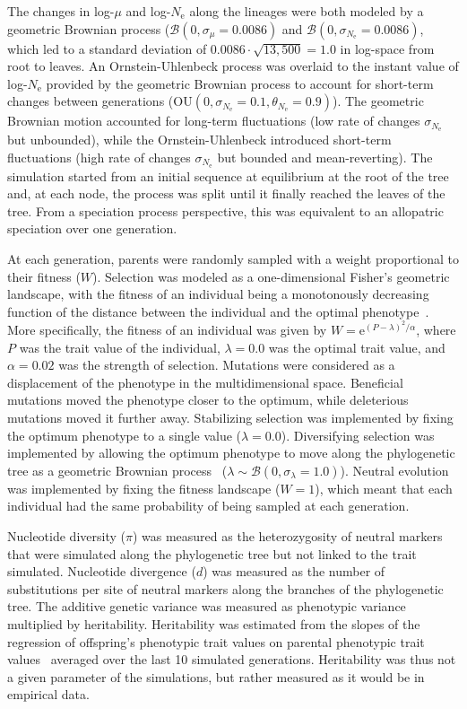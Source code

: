 \documentclass{article}
\newcommand{\Multiply}{\cdot}
\newcommand{\e}{\text{e}}
\newcommand{\Ne}{N_{\text{e}}}
\newcommand{\Trait}{P}
\newcommand{\MutationRatePheno}{\mu}
\newcommand{\brownian}{\mathcal{B}}
\begin{document}
The changes in log-$\MutationRatePheno$ and log-$\Ne$ along the lineages were both modeled by a geometric Brownian process ($\brownian \left(0, \sigma_{\MutationRatePheno}=0.0086\right)$ and $\brownian \left(0, \sigma_{\Ne}=0.0086\right)$, which led to a standard deviation of $0.0086 \Multiply \sqrt {13,500} = 1.0$ in log-space from root to leaves.
An Ornstein-Uhlenbeck process was overlaid to the instant value of log-$\Ne$ provided by the geometric Brownian process to account for short-term changes between generations ($\text{OU} \left(0, \sigma_{\Ne}=0.1, \theta_{\Ne}=0.9\right)$).
The geometric Brownian motion accounted for long-term fluctuations (low rate of changes $\sigma_{\Ne}$ but unbounded), while the Ornstein-Uhlenbeck introduced short-term fluctuations (high rate of changes $\sigma_{\Ne}$ but bounded and mean-reverting).
The simulation started from an initial sequence at equilibrium at the root of the tree and, at each node, the process was split until it finally reached the leaves of the tree.
From a speciation process perspective, this was equivalent to an allopatric speciation over one generation.

At each generation, parents were randomly sampled with a weight proportional to their fitness ($W$).
Selection was modeled as a one-dimensional Fisher's geometric landscape, with the fitness of an individual being a monotonously decreasing function of the distance between the individual and the optimal phenotype~\parencite{tenaillon_utility_2014,blanquart_epistasis_2016}.
More specifically, the fitness of an individual was given by $W = \e^{(\Trait - \lambda)^2/ \alpha}$, where $\Trait$ was the trait value of the individual, $\lambda=0.0$ was the optimal trait value, and $\alpha=0.02$ was the strength of selection.
Mutations were considered as a displacement of the phenotype in the multidimensional space.
Beneficial mutations moved the phenotype closer to the optimum, while deleterious mutations moved it further away.
Stabilizing selection was implemented by fixing the optimum phenotype to a single value ($\lambda=0.0$).
Diversifying selection was implemented by allowing the optimum phenotype to move along the phylogenetic tree as a geometric Brownian process~\parencite{hansen_stabilizing_1997} ($\lambda \sim \brownian \left(0, \sigma_{\lambda}=1.0\right)$).
Neutral evolution was implemented by fixing the fitness landscape ($W=1$), which meant that each individual had the same probability of being sampled at each generation.

Nucleotide diversity ($\pi$) was measured as the heterozygosity of neutral markers that were simulated along the phylogenetic tree but not linked to the trait simulated.
Nucleotide divergence ($d$) was measured as the number of substitutions per site of neutral markers along the branches of the phylogenetic tree.
The additive genetic variance was measured as phenotypic variance multiplied by heritability.
Heritability was estimated from the slopes of the regression of offspring's phenotypic trait values on parental phenotypic trait values~\parencite{lynch_genetics_1998} averaged over the last 10 simulated generations.
Heritability was thus not a given parameter of the simulations, but rather measured as it would be in empirical data.
\end{document}
